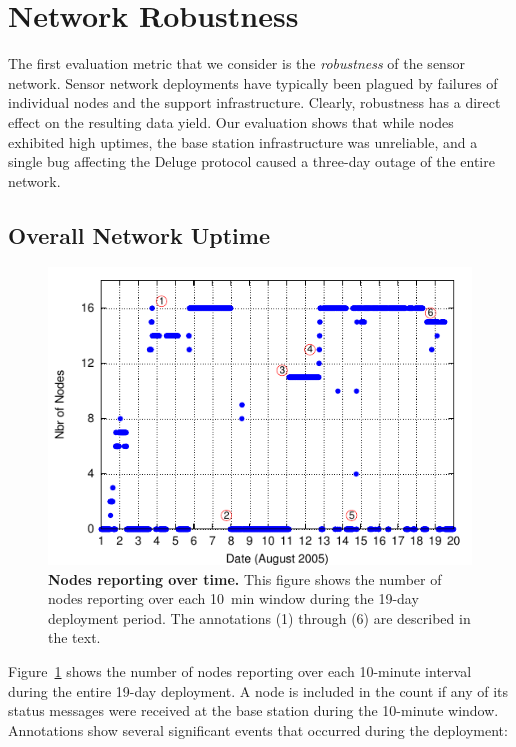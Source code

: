 \section{Network Robustness}
\label{evaluation-sec-robustness}

The first evaluation metric that we consider is the \textit{robustness} of
the sensor network. Sensor network deployments have typically been plagued by
failures of individual nodes and the support infrastructure. Clearly,
robustness has a direct effect on the resulting data yield. Our evaluation
shows that while nodes exhibited high uptimes, the base station
infrastructure was unreliable, and a single bug affecting the Deluge protocol
caused a three-day outage of the entire network.

\subsection{Overall Network Uptime}

\begin{figure}[t]
\begin{center}
\includegraphics[width=\hsize]{./3-evaluation/figs/nodesalive.pdf}
\end{center}

\caption{\textbf{Nodes reporting over time.} This figure shows the number of
nodes reporting over each 10~min window during the 19-day deployment period.
The annotations (1) through (6) are described in the text.}

\label{evaluation-fig-nodesalive}
\end{figure}

Figure~\ref{evaluation-fig-nodesalive} shows the number of nodes reporting
over each 10-minute interval during the entire 19-day deployment. A node is
included in the count if any of its status messages were received at the base
station during the 10-minute window. Annotations show several significant
events that occurred during the deployment:

